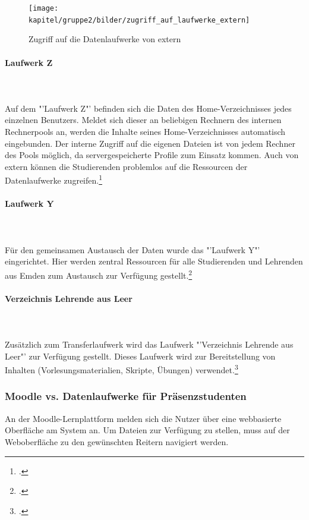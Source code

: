 \begin{figure}[h!]
	\centering
	\texttt{[image: kapitel/gruppe2/bilder/zugriff\_auf\_laufwerke\_extern]}
	\caption{Zugriff auf die Datenlaufwerke von extern \protect\footnotemark}
	\label{fig_zugriff_datenlaufwerke_extern}
\end{figure}


\paragraph{Laufwerk Z}\mbox{}\\\\
Auf dem "'Laufwerk Z"' befinden sich die Daten des Home-Verzeichnisses jedes einzelnen Benutzers. Meldet sich dieser an beliebigen Rechnern des internen Rechnerpools an, werden die Inhalte seines Home-Verzeichnisses automatisch eingebunden. Der interne Zugriff auf die eigenen Dateien ist von jedem Rechner des Pools möglich, da servergespeicherte Profile zum Einsatz kommen. Auch von extern können die Studierenden problemlos auf die Ressourcen der Datenlaufwerke zugreifen.\footcite{gunter_muller_interview}

\paragraph{Laufwerk Y}\mbox{}\\\\
Für den gemeinsamen Austausch der Daten wurde das "'Laufwerk Y"' eingerichtet. Hier werden zentral Ressourcen für alle Studierenden und Lehrenden aus Emden zum Austausch zur Verfügung gestellt.\footcite{gunter_muller_interview}

\paragraph{Verzeichnis Lehrende aus Leer}\mbox{}\\\\
Zusätzlich zum Transferlaufwerk wird das Laufwerk "'Verzeichnis Lehrende aus Leer"' zur Verfügung gestellt. Dieses Laufwerk wird zur Bereitstellung von Inhalten (Vorlesungsmaterialien, Skripte, Übungen) verwendet.\footcite{gunter_muller_interview}

\subsubsection{Moodle vs. Datenlaufwerke für Präsenzstudenten}
An der Moodle-Lernplattform melden sich die Nutzer über eine webbasierte Oberfläche am System an. Um Dateien zur Verfügung zu stellen, muss auf der Weboberfläche zu den gewünschten Reitern navigiert werden.

